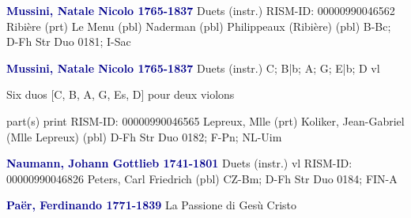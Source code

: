 \documentclass[twocolumn]{book}
\begin{document}
\newline \par \vspace{7pt} \textcolor{darkblue}{\textbf{Mussini, Natale Nicolo  1765-1837}}
\newline Duets (instr.)    
\newline RISM-ID: 00000990046562
\newline Ribière  (prt)
\newline Le Menu  (pbl)
\newline Naderman  (pbl)
\newline Philippeaux (Ribière)  (pbl)
\newline B-Bc; D-Fh  Str Duo 0181; I-Sac
\newline \par \vspace{7pt} \textcolor{darkblue}{\textbf{Mussini, Natale Nicolo  1765-1837}}
\newline Duets (instr.)  C; B|b; A; G; E|b; D  
 vl
\newline \begin{itshape}Six duos [C, B, A, G, Es, D] pour deux violons\end{itshape} 
\newline \textcolor{darkblue}{}  part(s)  
\newline print
\newline RISM-ID: 00000990046565
\newline Lepreux, Mlle  (prt)
\newline Koliker, Jean-Gabriel (Mlle Lepreux)  (pbl)
\newline D-Fh  Str Duo 0182; F-Pn; NL-Uim
\newline \par \vspace{7pt} \textcolor{darkblue}{\textbf{Naumann, Johann Gottlieb  1741-1801}}
\newline Duets (instr.)    
 vl
\newline RISM-ID: 00000990046826
\newline Peters, Carl Friedrich  (pbl)
\newline CZ-Bm; D-Fh  Str Duo 0184; FIN-A
\newline \par \vspace{7pt} \textcolor{darkblue}{\textbf{Paër, Ferdinando  1771-1839}}
\newline La Passione di Gesù Cristo    
\end{document}
